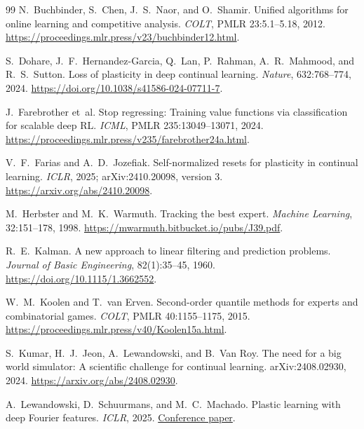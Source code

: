 \documentclass[11pt,twoside]{article}
\theoremstyle{definition}
\theoremstyle{remark}
\begin{document}
\begin{thebibliography}{99}
N.~Buchbinder, S.~Chen, J.~S.~Naor, and O.~Shamir.
\newblock Unified algorithms for online learning and competitive analysis.
\newblock \emph{COLT}, PMLR 23:5.1--5.18, 2012.
\newblock \url{https://proceedings.mlr.press/v23/buchbinder12.html}.

S.~Dohare, J.~F.~Hernandez-Garcia, Q.~Lan, P.~Rahman,
A.~R.~Mahmood, and R.~S.~Sutton.
\newblock Loss of plasticity in deep continual learning.
\newblock \emph{Nature}, 632:768--774, 2024.
\newblock \url{https://doi.org/10.1038/s41586-024-07711-7}.

J.~Farebrother et~al.
\newblock Stop regressing: Training value functions via classification for
scalable deep RL.
\newblock \emph{ICML}, PMLR 235:13049--13071, 2024.
\newblock \url{https://proceedings.mlr.press/v235/farebrother24a.html}.

V.~F.~Farias and A.~D.~Jozefiak.
\newblock Self-normalized resets for plasticity in continual learning.
\newblock \emph{ICLR}, 2025; arXiv:2410.20098, version 3.
\newblock \url{https://arxiv.org/abs/2410.20098}.

M.~Herbster and M.~K.~Warmuth.
\newblock Tracking the best expert.
\newblock \emph{Machine Learning}, 32:151--178, 1998.
\newblock \url{https://mwarmuth.bitbucket.io/pubs/J39.pdf}.

R.~E.~Kalman.
\newblock A new approach to linear filtering and prediction problems.
\newblock \emph{Journal of Basic Engineering}, 82(1):35--45, 1960.
\newblock \url{https://doi.org/10.1115/1.3662552}.

W.~M.~Koolen and T.~van Erven.
\newblock Second-order quantile methods for experts and combinatorial games.
\newblock \emph{COLT}, PMLR 40:1155--1175, 2015.
\newblock \url{https://proceedings.mlr.press/v40/Koolen15a.html}.

S.~Kumar, H.~J.~Jeon, A.~Lewandowski, and B.~Van Roy.
\newblock The need for a big world simulator: A scientific challenge for
continual learning.
\newblock arXiv:2408.02930, 2024.
\newblock \url{https://arxiv.org/abs/2408.02930}.

A.~Lewandowski, D.~Schuurmans, and M.~C.~Machado.
\newblock Plastic learning with deep Fourier features.
\newblock \emph{ICLR}, 2025.
\newblock \href{https://proceedings.iclr.cc/paper_files/paper/2025/file/4d42358702dff82e1436550a05ade260-Paper-Conference.pdf}{Conference paper}.


\end{thebibliography}
\end{document}
